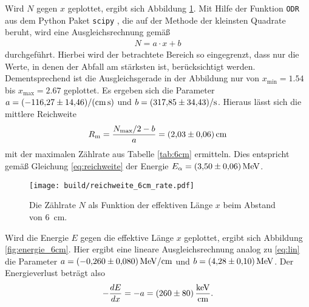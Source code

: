 \noindent
Wird $N$ gegen $x$ geplottet, ergibt sich Abbildung \ref{fig:rate_6cm}.
Mit Hilfe der Funktion \texttt{ODR} aus dem Python Paket \texttt{scipy} \cite[]{scipy}, 
die auf der Methode der kleinsten Quadrate beruht, 
wird eine Ausgleichsrechnung gemäß
\begin{align}
    N = a \cdot x + b
    \label{eq:lin}
\end{align}
durchgeführt.
Hierbei wird der betrachtete Bereich so eingegrenzt, dass nur die Werte, in denen der Abfall am stärksten ist, berücksichtigt werden.
Dementsprechend ist die Ausgleichsgerade in der Abbildung nur von $x_\text{min} = \num{1.54}$ bis $x_\text{max} = \num{2.67}$ geplottet.
%
Es ergeben sich die Parameter $a = \qty{-116.27 +- 14.46}{\per\cm\per\second}$ und $b = \qty{317.85 +- 34.43}{\per\second}$.
Hieraus lässt sich die mittlere Reichweite
\begin{align}
    R_\text{m} = \frac{N_\text{max} / 2 - b}{a} = \qty{2.03+-0.06}{\cm}
\end{align}
mit der maximalen Zählrate aus Tabelle \ref{tab:6cm} ermitteln.
Dies entspricht gemäß Gleichung \ref*{eq:reichweite} der Energie $E_\alpha = \qty{3.50+-0.06}{\mega\electronvolt}$.


\begin{figure}[H]
    \centering
    \texttt{[image: build/reichweite\_6cm\_rate.pdf]}
    \caption[]{Die Zählrate $N$ als Funktion der effektiven Länge $x$ beim Abstand von \qty{6}{\cm}.}
    \label{fig:rate_6cm}
\end{figure}

\noindent
Wird die Energie $E$ gegen die effektive Länge $x$ geplottet, ergibt sich Abbildung \ref{fig:energie_6cm}.
Hier ergibt eine lineare Ausgleichsrechnung analog zu \eqref{eq:lin} die Parameter $a = \qty{-0.260 +- 0.080}{\mega\electronvolt\per\cm}$
und $b = \qty{4.28 +- 0.10}{\mega\electronvolt}$.
Der Energieverlust beträgt also 
\begin{align}
    - \frac{dE}{dx} = -a = \qty{260 +- 80}{\kilo\electronvolt\per\cm}.
\end{align}


